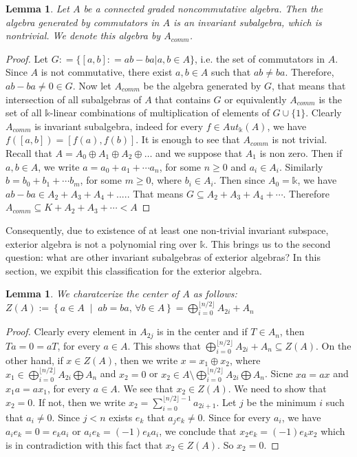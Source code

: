 \documentclass[12pt]{article}
\newtheorem{lemma}[theorem]{Lemma}
\numberwithin{theorem}{section}
\numberwithin{equation}{theorem}
\newcommand{\kk}{\mathds{k}}
\begin{document}
\begin{lemma} \label{lem:comminv}
Let $A$ be {a} connected graded noncommutative algebra. Then the algebra generated by  commutators in $A$ is an invariant subalgebra, which is nontrivial. We {denote} this algebra by  $A_{comm}$.
\end{lemma}
\begin{proof}
  Let $G : = \{ [a, b]: = ab - ba \vert a, b \in A\}$, i.e. the set of commutators in $A$. Since $A$ is not commutative, there exist $a, b \in A$ such that $ab \neq ba$. Therefore, $ab - ba \neq 0 \in G$. Now let $A_{comm}$ be the algebra generated by $G$, that means that  intersection of all subalgebras of $A$ that contains $G$ or equivalently $A_{comm}$ is the set of all $\kk$-linear combinations of multiplication of elements of $G \cup \{ 1\}$.  Clearly $A_{comm}$ is invariant subalgebra, indeed for every $ f \in Aut_{\kk}(A)$, we have $ f([a, b]) = [f(a) , f(b)]$. 
It is enough to see that 
$A_{comm}$ is not trivial. Recall that $A = A_0 \oplus A_1 \oplus A_2 \oplus \dots$ and we suppose that $A_1$ is non zero. Then if  
$a, b \in A$, we write 
$a = a_0 + a_1 + \cdots a_n$, for some $n \geq 0$ and $a_i \in A_i$. Similarly $ b = b_0 + b_1 + \cdots b_m $, for some $m \geq 0$,  where $b_i \in A_i$. Then since $A_0 = \kk$, we have  
$ab - ba \in A_{2} + A_3 + A_4 + .... $.
That means $ G \subseteq A_{2} + A_3 + A_4 + \cdots  $.  Therefore $A_{comm}  \subseteq K+ 
A_2 + A_3 + \cdots < A$ 
\end{proof}

Consequently, due to existence of at least one non-trivial invariant subspace, exterior algebra is not a polynomial ring over $\kk$. This brings us to the second question: what are other invariant subalgebras of exterior algebras? In this section, we expibit this classification for the exterior algebra.

\begin{lemma}
    We charatcerize the center of $A$ as follows: 
    $ Z(A):= \left\{ a \in A \; \middle | \; ab = ba,\, \forall b \in A \right\} = \bigoplus _{i = 0} ^{\lfloor n/2 \rfloor} A_{2i}  +  A_n$
\end{lemma}
\begin{proof}
    Clearly every element in $ A_{2j}$ is in the center and if $T \in A_n$, then $T a = 0 = aT$, for every $a \in A$. This shows that  $\bigoplus _{i = 0} ^{\lfloor n/2 \rfloor} A_{2i}  +  A_n \subseteq Z(A)$. On the other hand, if 
    $x \in Z(A)$, then 
    we write $ x = x_1 \oplus x_2$, where $x_1 \in \bigoplus _{i = 0} ^{\lfloor n/2 \rfloor} A_{2i} \bigoplus A_n$ and $x_2 = 0$ or  $x_2 \in A \setminus \bigoplus _{i = 0} ^{\lfloor n/2 \rfloor} A_{2i} \bigoplus A_n $. Sicne $ xa = ax 
    $ and $ x_1 a = a x_1$, for every $a \in A$. We see that $ x_2 \in Z(A)$. We need to show that $x_2 = 0$. If not, then we write $ x_2 = \sum _{i = 0} ^{ \lfloor n/2 \rfloor - 1 } a_{2i+ 1} $.
    Let $j$ be the minimum $i$ such that $a_i \neq 0$. 
    Since $ j < n$ exists $e_k$ that $ a_j  e_k \neq 0 $. 
    Since for  every  $a_i$, we have $ a_i e_k = 0 = e_k a_i$ or $ a_i e_k = (-1) e_k a_i $, we conclude that 
    $ x_2 e_k = (-1) e_k x_2$ which is in contradiction with this fact that $ x_2 \in Z(A)$. So $x_2 = 0$. 
\end{proof}
\end{document}
